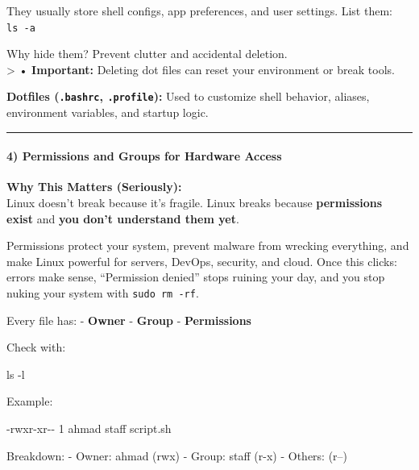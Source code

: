 \documentclass[
  english,
  paper=a4,
  oneside  ,captions=tableheading
]{scrartcl}
\newenvironment{Shaded}{}{}
\newcommand{\AttributeTok}[1]{\textcolor[rgb]{0.49,0.56,0.16}{#1}}
\newcommand{\ExtensionTok}[1]{#1}
\newcommand{\FunctionTok}[1]{\textcolor[rgb]{0.02,0.16,0.49}{#1}}
\newcommand{\NormalTok}[1]{#1}
\begin{document}
They usually store shell configs, app preferences, and user settings.
List them: \texttt{ls\ -a}

Why hide them? Prevent clutter and accidental deletion.\\
\textgreater{} • \textbf{Important:} Deleting dot files can reset your
environment or break tools.

\textbf{Dotfiles (\texttt{.bashrc}, \texttt{.profile}):} Used to
customize shell behavior, aliases, environment variables, and startup
logic.

\begin{center}\rule{0.5\linewidth}{0.5pt}\end{center}

\paragraph{4) Permissions and Groups for Hardware
Access}\label{permissions-and-groups-for-hardware-access}

\textbf{Why This Matters (Seriously):}\\
Linux doesn't break because it's fragile. Linux breaks because
\textbf{permissions exist} and \textbf{you don't understand them yet}.

Permissions protect your system, prevent malware from wrecking
everything, and make Linux powerful for servers, DevOps, security, and
cloud. Once this clicks: errors make sense, ``Permission denied'' stops
ruining your day, and you stop nuking your system with
\texttt{sudo\ rm\ -rf}.

Every file has: - \textbf{Owner} - \textbf{Group} - \textbf{Permissions}

Check with:

\begin{Shaded}
\begin{Highlighting}[]
\FunctionTok{ls} \AttributeTok{{-}l}
\end{Highlighting}
\end{Shaded}

Example:

\begin{Shaded}
\begin{Highlighting}[]
\ExtensionTok{{-}rwxr{-}xr{-}{-}}\NormalTok{ 1 ahmad staff script.sh}
\end{Highlighting}
\end{Shaded}

Breakdown: - Owner: ahmad (rwx) - Group: staff (r-x) - Others: (r--)
\end{document}
